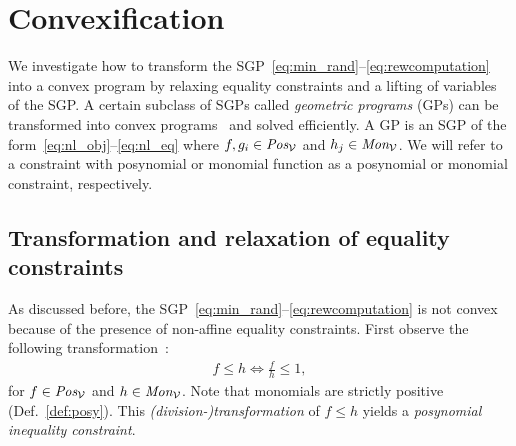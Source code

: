\section{Convexification}\label{sec:geometric}
%
We investigate how to transform the SGP~\eqref{eq:min_rand}--\eqref{eq:rewcomputation} into a convex program by relaxing equality constraints and a lifting of variables of the SGP. 
A certain subclass of SGPs called \emph{geometric programs} (GPs) can be transformed into convex programs~\cite[\S{}2.5]{boyd2007tutorial} and solved efficiently.
A GP is an SGP of the form~\eqref{eq:nl_obj}--\eqref{eq:nl_eq} where $f,g_i\in \posys[\Var]$ and $h_j\in\monos[\Var]$.
We will refer to a constraint with posynomial or monomial function as a posynomial or monomial constraint, respectively.
%
%
%
\subsection{Transformation and relaxation of equality constraints}
As discussed before, the SGP~\eqref{eq:min_rand}--\eqref{eq:rewcomputation} is not convex because of the presence of non-affine equality constraints. 
First observe the following transformation~\cite{boyd2007tutorial}:
\begin{align}
	f\leq h\Longleftrightarrow \frac{f}{h}\leq 1,\label{eq:geo_trans}
\end{align}
for $f\in\posys[\Var]$ and $h\in\monos [\Var]$. Note that monomials are strictly positive (Def.~\ref{def:posy}). This \emph{(division-)transformation} of $f\leq h$ yields a \emph{posynomial inequality constraint}.

